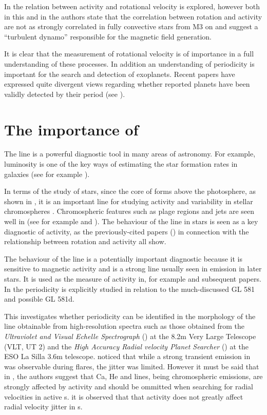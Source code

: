 In \citet{mohanty02} the relation between activity and rotational velocity is explored, however both in this and in
\citet{mohanty03} the authors state that the correlation between rotation and activity are not as strongly correlated in
fully convective stars from M3 on and suggest a ``turbulent dynamo'' responsible for the magnetic field generation.

It is clear that the measurement of rotational velocity is of importance in a full understanding of these processes. In
addition an understanding of periodicity is important for the search and detection of exoplanets. Recent papers have
expressed quite divergent views regarding whether reported planets have been validly detected by their period (see
\citealt{barnes13,robertson14,robertson14a,tuomi13aug,robertson15}). 

\section{The importance of {\ha}}
\protect\label{section:intohalpha}

The {\ha} line is a powerful diagnostic tool in many areas of astronomy. For example, {\ha} luminosity is one of the key
ways of estimating the star formation rates in galaxies (see for example \citet{rosagonzalez02}).

In terms of the study of stars, since the core of {\ha} forms above the photosphere, as shown in \citep{vernazza81}, it
is an important line for studying activity and variability in stellar chromospheres \citep{hall08}. Chromospheric
features such as plage regions and jets are seen well in {\ha} (see for example \citet{kneer10} and \citet{kuridze11}). 
The behaviour of the {\ha} line in {\rdwarf} stars is seen as a key diagnostic of activity, as the previously-cited
papers (\citealt{mohanty02, mohanty03, reiners08, schmidt14}) in connection with the relationship between rotation and
activity all show.

The behaviour of the {\ha} line is a potentially important diagnostic because it is sensitive to magnetic activity and
is a strong line usually seen in emission in later {\rdwarf} stars. It is used as the measure of activity in, for
example \citet{mohanty03} and subsequent papers. In \citet{hatzes15} the {\ha} periodicity is explicitly studied in
relation to the much-discussed GL 581 and possible GL 581d.

This {\paperorthesis} investigates whether periodicity can be identified in the morphology of the {\ha} line obtainable
from high-resolution spectra such as those obtained from the \textit{Ultraviolet and Visual Echelle Spectrograph}
({\uves}) at the 8.2m Very Large Telescope (VLT, UT 2) and the \textit{High Accuracy Radial velocity Planet Searcher}
({\harps}) at the ESO La Silla 3.6m telescope. \citet{barnes14} noticed that while a strong transient emission in {\ha}
was observable during flares, the jitter was limited. However it must be said that in \citet{reiners09}, the authors
suggest that Ca, He and {\ha} lines, being chromospheric emissions, are strongly affected by activity and should be
ommitted when searching for radial velocities in active \rdwarf s. it is observed that that activity does not greatly
affect radial velocity jitter in \rdwarf s.

